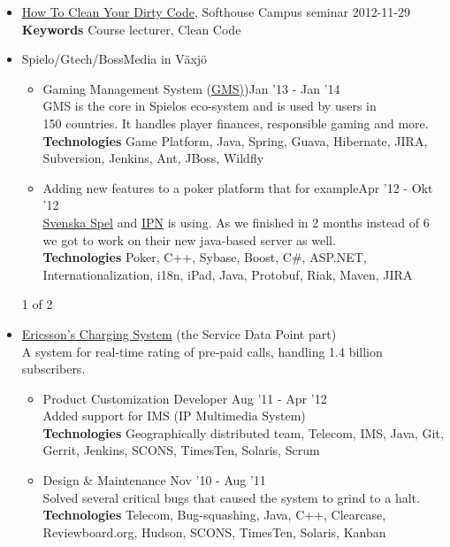 \documentclass[overlapped]{res}
\begin{document}
\begin{resume}
\begin{itemize}
\item \href{https://github.com/jontejj/how-to-clean-your-dirty-code}{How To Clean Your Dirty Code}, Softhouse Campus seminar	\hfill 2012-11-29
	\\{\bf Keywords} Course lecturer, Clean Code
\\
\item Spielo/Gtech/BossMedia in Växjö
	\begin{itemize}
	\itemsep -1pt
	\item Gaming Management System (\href{http://www.spielog2.com/products/spielo-g2-gaming-management-system-(gms).aspx}{GMS)})\hfill Jan '13 - Jan '14
		\\GMS is the core in Spielos eco-system and is used  by users in
		\\150 countries. It handles player finances, responsible gaming and more.  
		\\{\bf Technologies} Game Platform, Java, Spring, Guava, Hibernate, JIRA, 
		\\Subversion, Jenkins, Ant, JBoss, Wildfly
	\itemsep -1pt
	\item Adding new features to a poker platform that for example\hfill Apr '12 - Okt '12 
	\\\href{http://www.svenskaspel.se/poker}{Svenska Spel} and \href{http://www.ipnpoker.com/}{IPN} is using. As we 	finished in 2 months instead of 6 
	\\we got to work on their new java-based server as well.
	\\{\bf Technologies} Poker, C++, Sybase, Boost, C\#, ASP.NET, 
	\\Internationalization, i18n, iPad, Java, Protobuf, Riak, Maven, JIRA
	\end{itemize}
\vspace{0.8cm}
\centerline{1 of 2}
\newpage

\item \href{http://www.ericsson.com}{Ericsson's Charging System} (the Service Data Point part)
	\\A system for real-time rating of pre-paid calls, handling 1.4 billion subscribers.
	\begin{itemize}
	\itemsep -1pt
 	\item Product Customization Developer \hfill Aug '11 - Apr '12
     		\\Added support for IMS (IP Multimedia System)
		\\{\bf Technologies} Geographically distributed team, Telecom, IMS, Java, Git,
		\\Gerrit, Jenkins, SCONS, TimesTen, Solaris, Scrum
 	\item Design \& Maintenance \hfill Nov '10 - Aug '11
     		\\Solved several critical bugs that caused the system to grind to a halt.
		\\{\bf Technologies} Telecom, Bug-squashing, Java, C++, Clearcase, 
		\\Reviewboard.org, Hudson, SCONS, TimesTen, Solaris, Kanban
	\end{itemize}
\end{itemize}


\end{resume}
\end{document}
